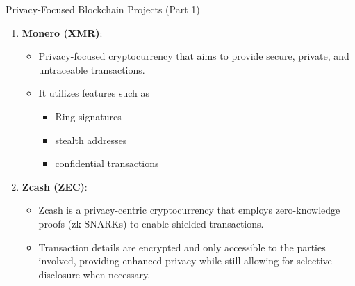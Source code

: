 \begin{frame}{Privacy-Focused Blockchain Projects (Part 1)}
    \begin{enumerate}
        \item \textbf{Monero (XMR)}:
            \begin{itemize}
                \item Privacy-focused cryptocurrency that aims to provide secure, private, and untraceable transactions.
                \item It utilizes features such as
                \begin{itemize}
                    \item Ring signatures
                    \item stealth addresses
                    \item confidential transactions
                \end{itemize}
            \end{itemize}
        
        \item \textbf{Zcash (ZEC)}:
            \begin{itemize}
                \item Zcash is a privacy-centric cryptocurrency that employs zero-knowledge proofs (zk-SNARKs) to enable shielded transactions.
                \item Transaction details are encrypted and only accessible to the parties involved, providing enhanced privacy while still allowing for selective disclosure when necessary.
            \end{itemize}
    \end{enumerate}
\end{frame}

